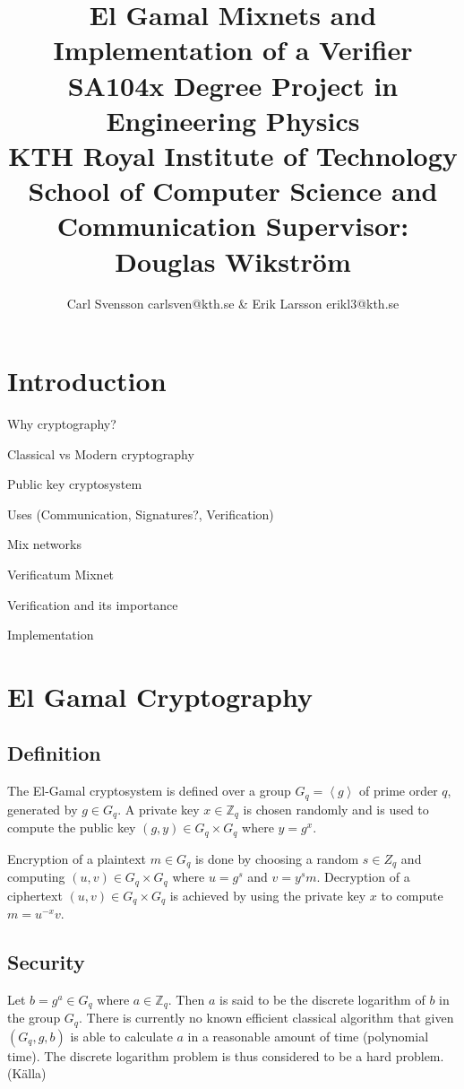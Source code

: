 \documentclass[10pt,a4paper]{article}
\author{Carl Svensson carlsven@kth.se \& Erik Larsson erikl3@kth.se}
\title{El Gamal Mixnets and Implementation of a Verifier \\ SA104x Degree Project in Engineering Physics \\
KTH Royal Institute of Technology \\
School of Computer Science and Communication
Supervisor: Douglas Wikström}
\begin{document}
\maketitle
\tableofcontents

\setlength{\parindent}{0pt}
\setlength{\parskip}{10pt plus 1pt minus 1pt}

\pagebreak
\section{Introduction}
Why cryptography?

Classical vs Modern cryptography

Public key cryptosystem

Uses (Communication, Signatures?, Verification)

Mix networks

Verificatum Mixnet

Verification and its importance

Implementation


\section{El Gamal Cryptography}

\subsection{Definition}
The El-Gamal cryptosystem is defined over a group $G_q =
\left<g\right>$ of prime order $q$, generated by $g \in G_q$. A
private key $x \in \mathbb{Z}_q$ is chosen randomly and is used to
compute the public key $(g,y) \in G_q \times G_q$ where $y =
g^x$. 

Encryption of a plaintext $m \in G_q$ is done by choosing a random $s
\in Z_q$ and computing $(u,v) \in G_q \times G_q$ where $u = g^s$ and
$v = y^sm$. Decryption of a ciphertext $(u,v) \in G_q \times G_q$ is
achieved by using the private key $x$ to compute $m = u^{-x}v$.

\subsection{Security}
Let $b = g^a \in G_q$ where $a \in \mathbb{Z}_q$. Then $a$ is said to
be the discrete logarithm of $b$ in the group $G_q$. There is
currently no known efficient classical algorithm that given $(G_q, g,
b)$ is able to calculate $a$ in a reasonable amount of time
(polynomial time). The discrete logarithm problem is thus considered
to be a hard problem. (Källa)
\end{document}
